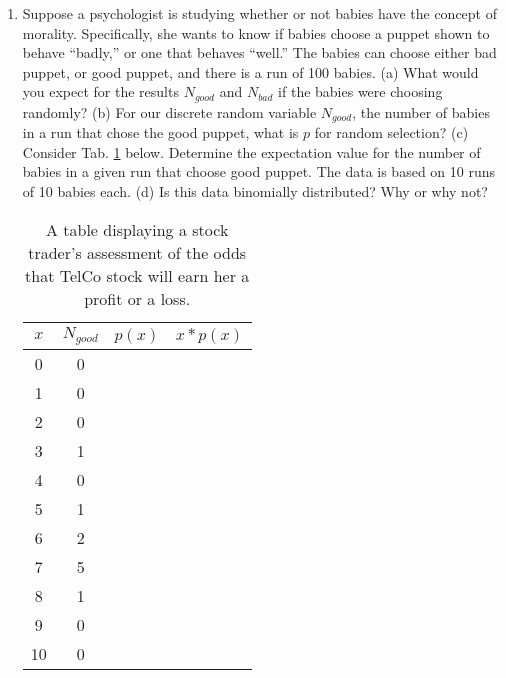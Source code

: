 \documentclass{article}
\begin{document}
\begin{enumerate}
\item Suppose a psychologist is studying whether or not babies have the concept of morality.  Specifically, she wants to know if babies choose a puppet shown to behave ``badly,'' or one that behaves ``well.''  The babies can choose either bad puppet, or good puppet, and there is a run of 100 babies. (a) What would you expect for the results $N_{good}$ and $N_{bad}$ if the babies were choosing randomly? (b) For our discrete random variable $N_{good}$, the number of babies in a run that chose the good puppet, what is $p$ for random selection?  (c) Consider Tab. \ref{tab:stock} below.  Determine the expectation value for the number of babies in a given run that choose good puppet.  The data is based on 10 runs of 10 babies each. (d) Is this data binomially distributed?  Why or why not?
\begin{table}
\centering
\begin{tabular}{| c | c | c | c |}
\hline
\textbf{$x$} & $N_{good}$ & $p(x)$ & $x*p(x)$ \\ \hline \hline
0 & 0 &  &  \\ \hline
1 & 0 &  &  \\ \hline
2 & 0 &  &  \\ \hline
3 & 1 &  &  \\ \hline
4 & 0 &  &  \\ \hline
5 & 1 &  &  \\ \hline
6 & 2 &  &  \\ \hline
7 & 5 &  &  \\ \hline
8 & 1 &  &  \\ \hline
9 & 0 &  &  \\ \hline
10 & 0 &  &  \\ \hline
\hline
\end{tabular}
\caption{\label{tab:stock} A table displaying a stock trader's assessment of the odds that TelCo stock will earn her a profit or a loss.}
\end{table}
\end{enumerate}
\end{document}
